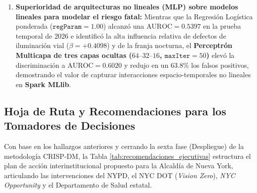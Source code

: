 \documentclass[11pt,a4paper]{article}
\begin{document}
\begin{enumerate}
    \item \textbf{Superioridad de arquitecturas no lineales (MLP) sobre modelos lineales para modelar el riesgo fatal:}
    Mientras que la Regresión Logística ponderada ($\texttt{regParam}=1.00$) alcanzó una $\text{AUROC} = 0.5397$ en la prueba temporal de 2026 e identificó la alta influencia relativa de defectos de iluminación vial ($\beta = +0.4098$) y de la franja nocturna, el \textbf{Perceptrón Multicapa de tres capas ocultas ($64\text{--}32\text{--}16$, $\texttt{maxIter}=50$)} elevó la discriminación a $\text{AUROC} = 0.6020$ y redujo en un $63.8\%$ los falsos positivos, demostrando el valor de capturar interacciones espacio-temporales no lineales en \textbf{Spark MLlib}.
\end{enumerate}

\subsection{Hoja de Ruta y Recomendaciones para los Tomadores de Decisiones}

Con base en los hallazgos anteriores y cerrando la sexta fase (Despliegue) de la metodología CRISP-DM, la Tabla \ref{tab:recomendaciones_ejecutivas} estructura el plan de acción interinstitucional propuesto para la Alcaldía de Nueva York, articulando las intervenciones del NYPD, el NYC DOT (\textit{Vision Zero}), \textit{NYC Opportunity} y el Departamento de Salud estatal.
\end{document}
